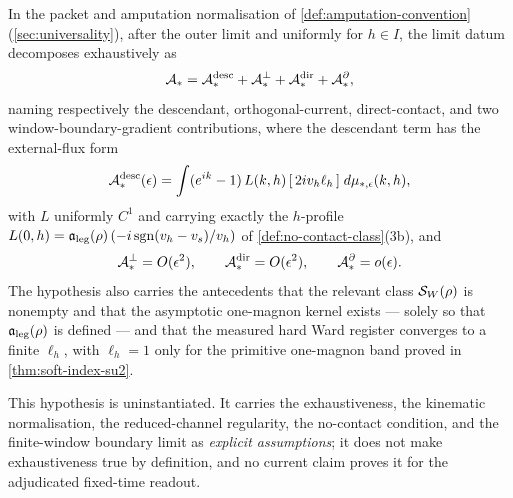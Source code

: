 \begin{definition}
\label{def:proto-lsz}
In the packet and amputation normalisation of \cref{def:amputation-convention}
(\cref{sec:universality}), after the outer limit and uniformly for $h\in I$,
the limit datum decomposes exhaustively as
\begin{equation}
  \mathcal{A}_*=\mathcal{A}_*^{\rm desc}+\mathcal{A}_*^{\perp}
            +\mathcal{A}_*^{\rm dir}+\mathcal{A}_*^{\partial},
  \label{eq:proto-lsz-split}
\end{equation}
naming respectively the descendant, orthogonal-current, direct-contact, and
two window-boundary-gradient contributions, where the descendant term has the
external-flux form
\begin{equation}
  \mathcal{A}_*^{\rm desc}(\epsilon)=
  \int(e^{ik}-1)\,L(k,h)\,[\,2iv_h\ell_h\,]\;d\mu_{*,\epsilon}(k,h),
  \label{eq:proto-lsz-desc}
\end{equation}
with $L$ uniformly $C^1$ and carrying exactly the $h$-profile
$L(0,h)=\mathfrak{a}_{\mathrm{leg}}(\rho)\,(-i\operatorname{sgn}(v_h-v_s)/v_h)$ of
\cref{def:no-contact-class}(3b), and
\begin{equation}
  \mathcal{A}_*^{\perp}=O(\epsilon^2),\qquad
  \mathcal{A}_*^{\rm dir}=O(\epsilon^2),\qquad
  \mathcal{A}_*^{\partial}=o(\epsilon).
  \label{eq:proto-lsz-bounds}
\end{equation}
The hypothesis also carries the antecedents that the relevant class
$\mathcal{S}_W(\rho)$ is nonempty and that the asymptotic one-magnon kernel exists
--- solely so that $\mathfrak{a}_{\mathrm{leg}}(\rho)$ is defined --- and that the measured hard Ward
register converges to a finite $\ell_h$, with $\ell_h=1$ only for the
primitive one-magnon band proved in \cref{thm:soft-index-su2}.
\end{definition}

This hypothesis is uninstantiated. It carries the exhaustiveness, the
kinematic normalisation, the reduced-channel regularity, the no-contact
condition, and the finite-window boundary limit as \emph{explicit assumptions};
it does not make exhaustiveness true by definition, and no current claim
proves it for the adjudicated fixed-time readout.

